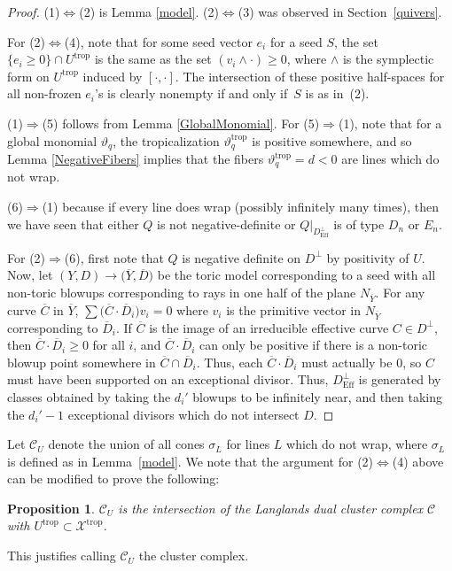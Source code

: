 \documentclass[10pt,a4paper]{amsart}
\numberwithin{equation}{section}
\numberwithin{figure}{section}
\numberwithin{table}{section}
\DeclareMathOperator{\trop}{trop}
\DeclareMathOperator{\Eff}{Eff}
\let\?=\overline
\let\rar=\rightarrow
\let\s=\mathcal
\newtheorem{prop}[thm]{Proposition}
\theoremstyle{definition}
\begin{document}
\begin{proof}(1)$\Leftrightarrow$(2) is Lemma \ref{model}. (2)$\Leftrightarrow$(3) was observed in Section~\ref{quivers}.

For (2)$\Leftrightarrow$(4), note that for some seed vector $e_i$ for a seed $S$, the set $\{e_i\geq 0\}\cap U^{\trop}$ is the same as the set $(v_i\wedge \cdot) \geq 0$, where $\wedge$ is the symplectic form on $U^{\trop}$ induced by $[ \cdot,\cdot]$. The intersection of these positive half-spaces for all non-frozen $e_i$'s is clearly nonempty if and only if~$S$ is as in~(2).

 (1)$\Rightarrow$(5) follows from Lemma \ref{GlobalMonomial}. For (5)$\Rightarrow$(1), note that for a global monomial $\vartheta_q$, the tropicalization $\vartheta_q^{\trop}$ is positive somewhere, and so Lemma \ref{NegativeFibers} implies that the fibers $\vartheta_q^{\trop}=d<0$ are lines which do not wrap.

 (6)$\Rightarrow$(1) because if every line does wrap (possibly infinitely many times), then we have seen that either $Q$ is not negative-definite or $Q|_{D^{\perp}_{\Eff}}$ is of type $D_n$ or $E_n$.

 For (2)$\Rightarrow$(6), first note that $Q$ is negative definite on $D^{\perp}$ by positivity of $U$. Now, let $(Y,D)\rar \big(\?{Y},\?{D}\big)$ be the toric model corresponding to a seed with all non-toric blowups corresponding to rays in one half of the plane $N_{\?{Y}}$. For any curve $\?{C}$ in $\?{Y}$, $\sum \big(\?{C}\cdot \?{D}_i\big) v_i=0$ where $v_i$ is the primitive vector in $N_{\?{Y}}$ corresponding to $\?{D}_i$. If $\?{C}$ is the image of an irreducible effective curve $C\in D^{\perp}$, then $\?{C}\cdot \?{D}_i \geq 0$ for all $i$, and $\?{C}\cdot \?{D}_i$ can only be positive if there is a non-toric blowup point somewhere in $\?{C} \cap \?{D}_i$. Thus, each $\?{C}\cdot \?{D}_i$ must actually be $0$, so $C$ must have been supported on an exceptional divisor. Thus, $D^{\perp}_{\Eff}$ is generated by classes obtained by taking the $d_i'$ blowups to be infinitely near, and then taking the $d_i'-1$ exceptional divisors which do not intersect $D$.
\end{proof}


Let $\s{C}_U$ denote the union of all cones $\sigma_L$ for lines $L$ which do not wrap, where $\sigma_L$ is defined as in Lemma~\ref{model}. We note that the argument for (2)$\Leftrightarrow$(4) above can be modified to prove the following:
\begin{prop} $\s{C}_U$ is the intersection of the Langlands dual cluster complex $\s{C}$ with $U^{\trop}\subset \s{X}^{\trop}$.
\end{prop}
This justifies \cite{Man1} calling $\s{C}_U$ the cluster complex.
\end{document}
